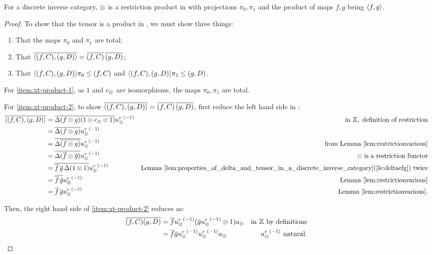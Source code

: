 \begin{lemma}\label{lem:tensor_on_x_is_the_restriction_product_on_xt}
  For \X a discrete inverse category, $\otimes$ is a restriction product in \Xt with projections $\pi_0,
  \pi_1$ and the product of maps  $f, g$ being $\langle f,g\rangle$.
\end{lemma}
\begin{proof}
  To show that the tensor is a product in \Xt, we must show three things:
  \begin{enumerate}[{(}i{)}]
    \item That the maps $\pi_0$ and $\pi_1$ are total; \label{item:xt-product-1}
    \item That  $\overline{\langle(f,C),(g,D)\rangle} = \overline{(f,C)}\,\overline{(g,D)}$; \label{item:xt-product-2}
    \item That $\langle(f,C),(g,D)\rangle \pi_0 \le (f,C)$ and $\langle(f,C),(g,D)\rangle \pi_1 \le (g,D)$. \label{item:xt-product-3}
  \end{enumerate}
  For \ref{item:xt-product-1}, as $1$ and $c_{\otimes}$ are isomorphisms, the maps $\pi_0, \pi_1$ are
  total.

  For \ref{item:xt-product-2}, to show $\overline{\langle(f,C),(g,D)\rangle} = \overline{(f,C)}\,\overline{(g,D)}$, first
  reduce the left hand side in \X:
  \begin{align*}
    \overline{\langle(f,C),(g,D)\rangle}
      &=\overline{\Delta(f\otimes g)(1\otimes c_{\otimes}\otimes1)}{u_{\otimes}^r}^{(-1)}&\text{in }\mathbb{X}, \text{ definition of restriction}\\
    &=\overline{\Delta(f\otimes g)}{u_{\otimes}^r}^{(-1)} &\\
    &=\overline{\Delta\overline{(f\otimes g)}}{u_{\otimes}^r}^{(-1)} &\text{from Lemma \ref{lem:restrictionvarious}}\\
    &=\overline{\Delta(\overline{f}\otimes\overline{g})}{u_{\otimes}^r}^{(-1)} &\otimes\text{ is a restriction functor}\\
    &=\overline{\overline{f}\,\overline{g}\,\Delta(1\otimes1)}{u_{\otimes}^r}^{(-1)}
      &\text{Lemma  \ref{lem:properties_of_delta_and_tensor_in_a_discrete_inverse_category}(\ref{le:deltaefg}) twice}\\
    &=\overline{\overline{f}\,\overline{g}}{u_{\otimes}^r}^{(-1)} &\text{Lemma  \ref{lem:restrictionvarious}}\\
    &=\overline{f}\,\overline{g}{u_{\otimes}^r}^{(-1)}  &\text{Lemma  \ref{lem:restrictionvarious}.}\\
  \end{align*}

  Then, the right hand side of \ref{item:xt-product-2} reduces as:
  \begin{align*}
    \rst{(f,C)} \rst{(g,D)}
    &= \rst{f}\inv{\usr}(\rst{g}\inv{\usr} \* 1) a_{\*} & \text{in \X by definitions}\\
    &= \rst{f} \rst{g}\inv{\usr}\inv{\usr} a_{\*} &  \inv{\usr}\text{ natural.}
  \end{align*}


\end{proof}
